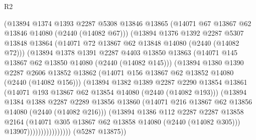 \begin{lexlean}{R2}
\begin{coremodule}
                        (@13894
                          @1374
                          @1393
                          @2287
                          @5308
                          @13846
                          @13865
                          (@14071 @67 @13867 @62 @13846 @14080 (@2440 (@14082 @67)))
                          (@13894
                            @1376
                            @1392
                            @2287
                            @5307
                            @13848
                            @13864
                            (@14071 @72 @13867 @62 @13848 @14080 (@2440 (@14082 @72)))
                            (@13894
                              @1378
                              @1391
                              @2287
                              @4403
                              @13850
                              @13863
                              (@14071 @145 @13867 @62 @13850 @14080 (@2440 (@14082 @145)))
                              (@13894
                                @1380
                                @1390
                                @2287
                                @2606
                                @13852
                                @13862
                                (@14071 @156 @13867 @62 @13852 @14080 (@2440 (@14082 @156)))
                                (@13894
                                  @1382
                                  @1389
                                  @2287
                                  @2290
                                  @13854
                                  @13861
                                  (@14071 @193 @13867 @62 @13854 @14080 (@2440 (@14082 @193)))
                                  (@13894
                                    @1384
                                    @1388
                                    @2287
                                    @2289
                                    @13856
                                    @13860
                                    (@14071 @216 @13867 @62 @13856 @14080 (@2440 (@14082 @216)))
                                    (@13894
                                      @1386
                                      @112
                                      @2287
                                      @2287
                                      @13858
                                      @2164
                                      (@14071 @305 @13867 @62 @13858 @14080 (@2440 (@14082 @305)))
                                      @13907))))))))))))))))
      (@5287 @13875))

\end{coremodule}
\end{lexlean}
